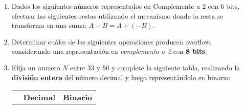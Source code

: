 \documentclass[12pt]{article}
\begin{document}
\begin{enumerate}

    \item Dados los siguientes números representados en Complemento a 2 con 6
        bits, efectuar las siguientes restas utilizando el mecanismo donde la
        resta se transforma en una suma: $A-B = A+(-B)$.


    \item Determinar cuáles de las siguientes operaciones producen overflow,
        considerando una representación en \emph{complemento a 2} con
        \textbf{8 bits}:


    \item Elija un numero $N$ entre 33 y 50 y complete la siguiente tabla,
        realizando la \textbf{división entera} del número decimal y luego
        representándolo en binario:

        \begin{center}

            \begin{tabular}[t]{|c|c|c|}

            \cline{2-3}

            \multicolumn{1}{c|}{}& \textbf{Decimal} & \textbf{Binario} \\


\end{tabular}
\end{center}
\end{enumerate}
\end{document}
